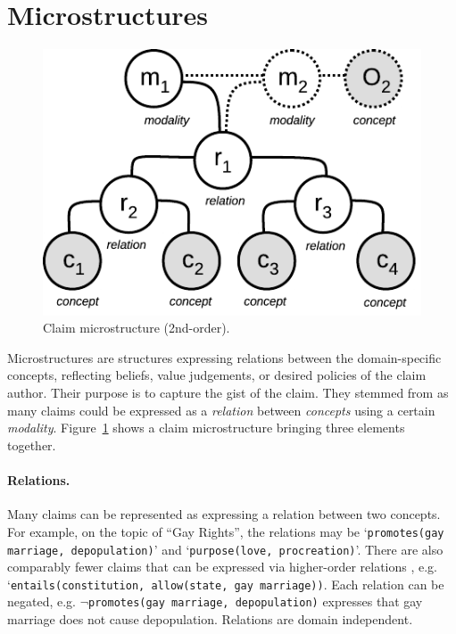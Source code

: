 \section{Microstructures}
\label{sec:for_microstructures}

\begin{figure}
	\begin{center}
      \includegraphics[scale=1]{microstructure.pdf}
      \end{center}
      \caption{Claim microstructure (2nd-order).}
  \label{fig:structures_flowchart}
\end{figure}

Microstructures are structures expressing relations between the domain-specific
concepts, reflecting beliefs, value judgements, or desired policies of the claim
author. Their purpose is to capture the gist of the claim. 
They stemmed from as many claims could be expressed as a \emph{relation}
between \emph{concepts} using a certain \emph{modality}. 
Figure~\ref{fig:structures_flowchart} shows a claim microstructure bringing three elements 
together. 

\paragraph{Relations. }  Many claims can be represented as expressing a
relation between two concepts. For example, on the topic of ``Gay Rights'', 
the relations may be `\texttt{promotes(gay marriage, depopulation)}' and 
`\texttt{purpose(love, procreation)}'. 
There are also comparably fewer claims that can be expressed via
higher-order relations , e.g. `\texttt{entails(constitution, allow(state, gay marriage))}. 
Each relation can be negated, e.g. $\neg$\texttt{promotes(gay marriage,
depopulation)} expresses that gay marriage does not cause depopulation. 
Relations are domain independent. 

